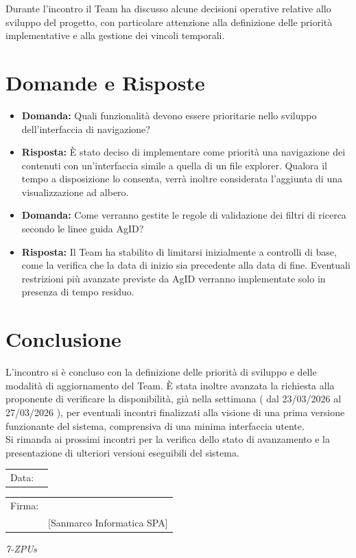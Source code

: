 \documentclass[a4paper,12pt]{article}
\begin{document}
Durante l'incontro il Team ha discusso alcune decisioni operative relative allo sviluppo del progetto, con particolare attenzione 
alla definizione delle priorità implementative e alla gestione dei vincoli temporali.

\section{Domande e Risposte}

\begin{itemize}
    \item \textbf{Domanda:} Quali funzionalità devono essere prioritarie nello sviluppo dell'interfaccia di navigazione?
    \item \textbf{Risposta:} È stato deciso di implementare come priorità una navigazione dei contenuti con un'interfaccia simile 
    a quella di un file explorer. Qualora il tempo a disposizione lo consenta, verrà inoltre considerata l'aggiunta di una visualizzazione ad albero.
    \item \textbf{Domanda:} Come verranno gestite le regole di validazione dei filtri di ricerca secondo le linee guida AgID?
    \item \textbf{Risposta:} Il Team ha stabilito di limitarsi inizialmente a controlli di base, come la verifica che la data 
    di inizio sia precedente alla data di fine. Eventuali restrizioni più avanzate previste da AgID verranno implementate solo in presenza di tempo residuo.
\end{itemize}

\section{Conclusione}

L'incontro si è concluso con la definizione delle priorità di sviluppo e delle modalità di aggiornamento del Team. È stata inoltre avanzata la richiesta 
alla proponente di verificare la disponibilità, già nella settimana ( dal 23/03/2026 al 27/03/2026 ), per eventuali incontri finalizzati alla visione di una 
prima versione funzionante del sistema, comprensiva di una minima interfaccia utente. 
\\Si rimanda ai prossimi incontri per la verifica dello stato di 
avanzamento e la presentazione di ulteriori versioni eseguibili del sistema.

\vfill

\begin{flushleft}
\begin{tabular}{@{}p{0.5in}p{2in}@{}}
Data: & \hrulefill \\
\end{tabular}

\vspace{1em}

\begin{tabular}{@{}p{0.5in}p{2in}@{}}
Firma: & \hrulefill \\
& [Sanmarco Informatica SPA] \\
\end{tabular}
\end{flushleft}

\begin{flushright}
    \textit{7-ZPUs}
\end{flushright}
\end{document}
